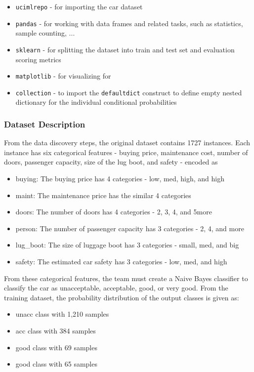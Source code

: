 \documentclass[a4paper]{article}
\begin{document}
\begin{itemize}
    \item \lstinline{ucimlrepo} - for importing the car dataset
    \item \lstinline{pandas} - for working with data frames and related tasks, such as statistics, sample counting, ...
    \item \lstinline{sklearn} - for splitting the dataset into train and test set and evaluation scoring metrics 
    \item \lstinline{matplotlib} - for visualizing for 
    \item \lstinline{collection} - to import the \lstinline{defaultdict} construct to define empty nested dictionary for the individual conditional probabilities
\end{itemize}

\subsubsection{Dataset Description}
From the data discovery steps, the original dataset contains 1727 instances. Each instance has six categorical features - buying price, maintenance cost, number of doors, passenger capacity, size of the lug boot, and safety - encoded as 

\begin{itemize}
    \item buying: The buying price has 4 categories - low, med, high, and high
    \item  maint: The maintenance price has the similar 4 categories
    \item doors: The number of doors has 4 categories - 2, 3, 4, and 5more
    \item person: The number of passenger capacity has 3 categories - 2, 4, and more
    \item lug\_boot: The size of luggage boot has 3 categories - small, med, and big
    \item safety: The estimated car safety has 3 categories - low, med, and high
\end{itemize}

From these categorical features, the team must create a Naive Bayes classifier to classify the car as unacceptable, acceptable, good, or very good. From the training dataset, the probability distribution of the output classes is given as:

\begin{itemize}
    \item unacc class with 1,210 samples
    \item acc class with 384 samples
    \item good class with 69 samples
    \item good class with 65 samples
\end{itemize}
\end{document}
